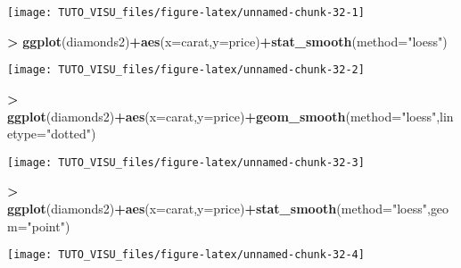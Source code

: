 \documentclass[]{book}
\newenvironment{Shaded}{\begin{snugshade}}{\end{snugshade}}
\newcommand{\DataTypeTok}[1]{\textcolor[rgb]{0.13,0.29,0.53}{#1}}
\newcommand{\KeywordTok}[1]{\textcolor[rgb]{0.13,0.29,0.53}{\textbf{#1}}}
\newcommand{\NormalTok}[1]{#1}
\newcommand{\OperatorTok}[1]{\textcolor[rgb]{0.81,0.36,0.00}{\textbf{#1}}}
\newcommand{\StringTok}[1]{\textcolor[rgb]{0.31,0.60,0.02}{#1}}
\theoremstyle{definition}
\theoremstyle{definition}
\theoremstyle{definition}
\theoremstyle{remark}
\begin{document}
\begin{center}\texttt{[image: TUTO\_VISU\_files/figure-latex/unnamed-chunk-32-1]} \end{center}

\begin{Shaded}
\begin{Highlighting}[]
\OperatorTok{>}\StringTok{ }\KeywordTok{ggplot}\NormalTok{(diamonds2)}\OperatorTok{+}\KeywordTok{aes}\NormalTok{(}\DataTypeTok{x=}\NormalTok{carat,}\DataTypeTok{y=}\NormalTok{price)}\OperatorTok{+}\KeywordTok{stat_smooth}\NormalTok{(}\DataTypeTok{method=}\StringTok{"loess"}\NormalTok{)}
\end{Highlighting}
\end{Shaded}

\begin{center}\texttt{[image: TUTO\_VISU\_files/figure-latex/unnamed-chunk-32-2]} \end{center}

\begin{Shaded}
\begin{Highlighting}[]
\OperatorTok{>}\StringTok{ }\KeywordTok{ggplot}\NormalTok{(diamonds2)}\OperatorTok{+}\KeywordTok{aes}\NormalTok{(}\DataTypeTok{x=}\NormalTok{carat,}\DataTypeTok{y=}\NormalTok{price)}\OperatorTok{+}\KeywordTok{geom_smooth}\NormalTok{(}\DataTypeTok{method=}\StringTok{"loess"}\NormalTok{,}\DataTypeTok{linetype=}\StringTok{"dotted"}\NormalTok{)}
\end{Highlighting}
\end{Shaded}

\begin{center}\texttt{[image: TUTO\_VISU\_files/figure-latex/unnamed-chunk-32-3]} \end{center}

\begin{Shaded}
\begin{Highlighting}[]
\OperatorTok{>}\StringTok{ }\KeywordTok{ggplot}\NormalTok{(diamonds2)}\OperatorTok{+}\KeywordTok{aes}\NormalTok{(}\DataTypeTok{x=}\NormalTok{carat,}\DataTypeTok{y=}\NormalTok{price)}\OperatorTok{+}\KeywordTok{stat_smooth}\NormalTok{(}\DataTypeTok{method=}\StringTok{"loess"}\NormalTok{,}\DataTypeTok{geom=}\StringTok{"point"}\NormalTok{)}
\end{Highlighting}
\end{Shaded}

\begin{center}\texttt{[image: TUTO\_VISU\_files/figure-latex/unnamed-chunk-32-4]} \end{center}
\end{document}

